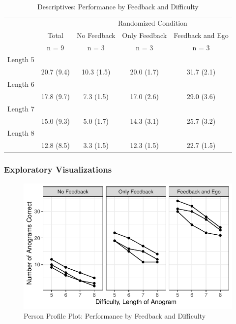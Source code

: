 \documentclass[
]{article}
\begin{document}
\begin{table}[ ht ] 
\centering 
\caption{Descriptives: Performance by Feedback and Difficulty}\label{}
\begin{tabular}{ l c c c c }
\toprule
 &   &  \multicolumn{ 3 }{c}{ Randomized Condition }\\ 
  & Total & No Feedback & Only Feedback & Feedback and Ego \\ 
 & n = 9 & n = 3 & n = 3 & n = 3 \\ 
 \midrule
Length 5 &   &   &   &  \\ 
\hspace{6pt}   & 20.7 (9.4) & 10.3 (1.5) & 20.0 (1.7) & 31.7 (2.1)\\ 
Length 6 &   &   &   &  \\ 
\hspace{6pt}   & 17.8 (9.7) & 7.3 (1.5) & 17.0 (2.6) & 29.0 (3.6)\\ 
Length 7 &   &   &   &  \\ 
\hspace{6pt}   & 15.0 (9.3) & 5.0 (1.7) & 14.3 (3.1) & 25.7 (3.2)\\ 
Length 8 &   &   &   &  \\ 
\hspace{6pt}   & 12.8 (8.5) & 3.3 (1.5) & 12.3 (1.5) & 22.7 (1.5)\\ 
\bottomrule

\end{tabular}
\end{table}

\clearpage

\hypertarget{exploratory-visualizations}{%
\subsubsection{Exploratory
Visualizations}\label{exploratory-visualizations}}

\begin{figure}

{\centering \includegraphics{Chapter-16-Assignment-R-Skeleton--2020spring-_files/figure-latex/unnamed-chunk-12-1} 

}

\caption{Person Profile Plot: Performance by Feedback and Difficulty}\label{fig:unnamed-chunk-12}
\end{figure}
\end{document}
